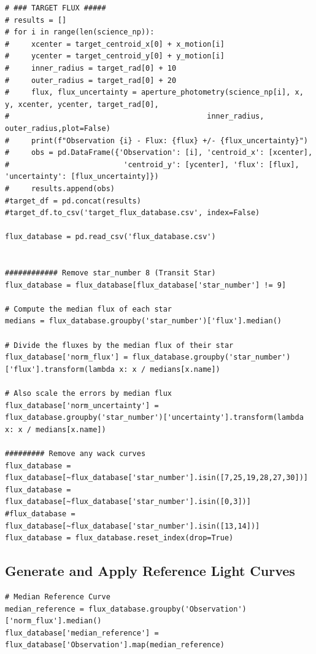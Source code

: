 \documentclass{article}
\begin{document}
\begin{appendices}
\begin{scriptsize}
\begin{verbatim}
# ### TARGET FLUX #####
# results = []
# for i in range(len(science_np)):
#     xcenter = target_centroid_x[0] + x_motion[i]
#     ycenter = target_centroid_y[0] + y_motion[i]
#     inner_radius = target_rad[0] + 10
#     outer_radius = target_rad[0] + 20
#     flux, flux_uncertainty = aperture_photometry(science_np[i], x, y, xcenter, ycenter, target_rad[0], 
#                                             inner_radius, outer_radius,plot=False)
#     print(f"Observation {i} - Flux: {flux} +/- {flux_uncertainty}")
#     obs = pd.DataFrame({'Observation': [i], 'centroid_x': [xcenter], 
#                          'centroid_y': [ycenter], 'flux': [flux], 'uncertainty': [flux_uncertainty]})
#     results.append(obs)
#target_df = pd.concat(results)
#target_df.to_csv('target_flux_database.csv', index=False)

flux_database = pd.read_csv('flux_database.csv')


############ Remove star_number 8 (Transit Star)
flux_database = flux_database[flux_database['star_number'] != 9]

# Compute the median flux of each star
medians = flux_database.groupby('star_number')['flux'].median()

# Divide the fluxes by the median flux of their star
flux_database['norm_flux'] = flux_database.groupby('star_number')['flux'].transform(lambda x: x / medians[x.name])

# Also scale the errors by median flux
flux_database['norm_uncertainty'] = flux_database.groupby('star_number')['uncertainty'].transform(lambda x: x / medians[x.name])

######### Remove any wack curves
flux_database = flux_database[~flux_database['star_number'].isin([7,25,19,28,27,30])]
flux_database = flux_database[~flux_database['star_number'].isin([0,3])] 
#flux_database = flux_database[~flux_database['star_number'].isin([13,14])] 
flux_database = flux_database.reset_index(drop=True)
\end{verbatim}    
\end{scriptsize}

\subsection{Generate and Apply Reference Light Curves}
\begin{scriptsize}
\begin{verbatim}
# Median Reference Curve
median_reference = flux_database.groupby('Observation')['norm_flux'].median()
flux_database['median_reference'] = flux_database['Observation'].map(median_reference)


\end{verbatim}
\end{scriptsize}
\end{appendices}
\end{document}
